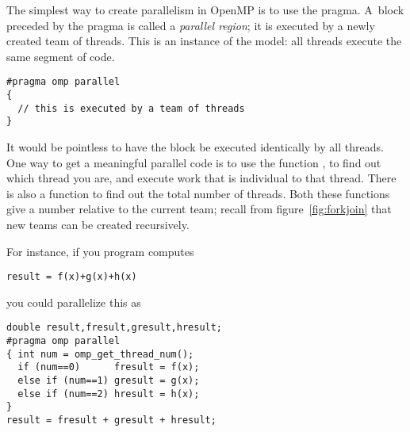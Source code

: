
\label{sec:parallelregion}

The simplest way to create parallelism in OpenMP is to use
the  pragma. A~block preceded by the  pragma
is called a \emph{parallel region}; it
is executed by a newly created team of threads. 
This is an instance of the  model: all threads execute the same
segment of code.
\begin{lstlisting}
#pragma omp parallel
{
  // this is executed by a team of threads
}
\end{lstlisting}
It would be pointless to have the block be executed identically by
all threads. One way to get a meaningful parallel code is to use the function
, to find out which thread you are,
and execute work that is individual to that thread.
There is also a function
 to find out the total number of threads.
Both these functions give a number relative to the current team;
recall from figure~\ref{fig:forkjoin} that new teams can be created recursively.

For instance, if you program computes
\begin{lstlisting}
result = f(x)+g(x)+h(x)
\end{lstlisting}
you could parallelize this as
\begin{lstlisting}
double result,fresult,gresult,hresult;
#pragma omp parallel
{ int num = omp_get_thread_num();
  if (num==0)      fresult = f(x);
  else if (num==1) gresult = g(x);
  else if (num==2) hresult = h(x);
}
result = fresult + gresult + hresult;
\end{lstlisting}


